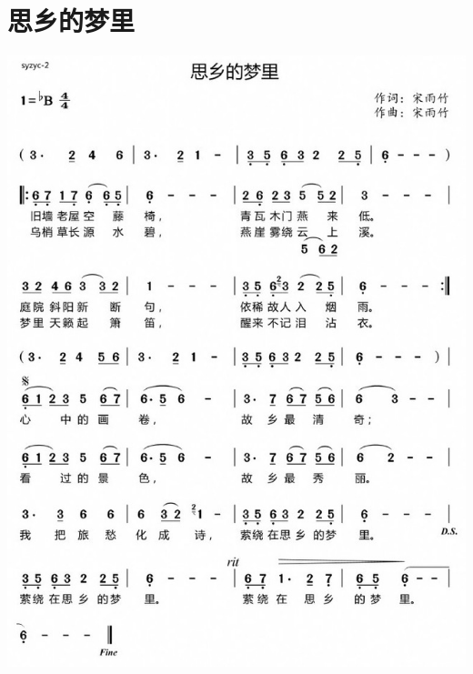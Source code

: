 \documentclass[cn,pad,twocol]{elegantbook}
\begin{document}
\section{思乡的梦里} \includegraphics[width=\textwidth]{dongxiao/20200901-思乡的梦里.jpeg}
\end{document}
